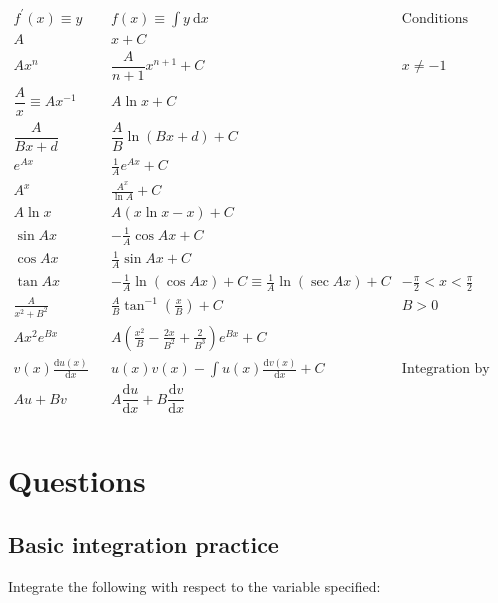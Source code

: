 \documentclass[
]{book}
\begin{document}
\begin{equation*}
\begin{array}{cccc}
f^{\prime}(x) \equiv y & & f(x) \equiv \int y ~\textrm{d}x & \textrm{Conditions}\\
  \hline
  \hline
A & & x + C \\ 
Ax^n & & \dfrac{A}{n+1}x^{n+1}+ C & x \neq -1\\ 
\dfrac{A}{x} \equiv A x^{-1} & &  A \ln x + C\\  
\dfrac{A}{Bx+ d} & & \dfrac{A}{B} \ln(Bx + d) +C\\ 
e^{Ax} & &\frac{1}{A} e^{Ax} + C\\
A^x && \frac{A^x}{\ln A} +C\\
A \ln x & & A \left( x \ln x - x \right)+ C\\

\sin Ax & &-\frac{1}{A}\cos Ax + C\\ 
\cos Ax & &\frac{1}{A}\sin Ax + C\\
\tan Ax & &-\frac{1}{A}\ln(\cos Ax) + C \equiv \frac{1}{A}\ln(\sec Ax) + C & -\frac{\pi}{2} < x < \frac{\pi}{2}\\

\frac{A}{x^2 + B^2} && \frac{A}{B}\tan^{-1}\left(\frac{x}{B}\right) + C &B>0\\
Ax^2 e^{Bx} && A\left(\frac{x^2}{B} - \frac{2x}{B^2} + \frac{2}{B^3} \right)e^{Bx} +C\\

v(x) \frac{\textrm{d}u(x)}{\textrm{d}x} && u(x)v(x) - \int u(x)\frac{\textrm{d}v(x)}{\textrm{d}x} +C & \textrm{Integration by Parts}\\

Au + Bv & &A\dfrac{\textrm{d}u}{\textrm{d}x} + B\dfrac{\textrm{d}v}{\textrm{d}x} \\
\end{array}
\end{equation*}

\hypertarget{sec:Questions6}{%
\section{Questions}\label{sec:Questions6}}

\hypertarget{basic-integration-practice}{%
\subsection{Basic integration practice}\label{basic-integration-practice}}

Integrate the following with respect to the variable specified:
\end{document}
